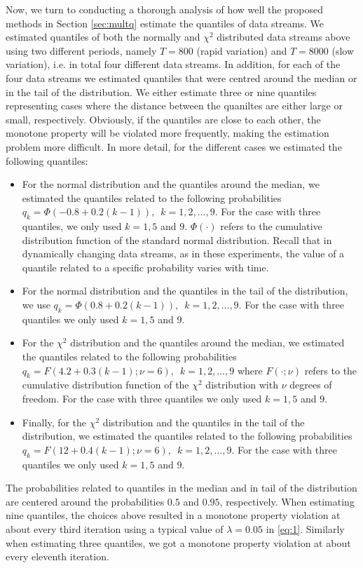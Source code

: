 \documentclass[10pt, a4paper]{article}
\newtheorem{rational for conjecture}{Rational for Conjecture}
\begin{document}
Now, we turn to conducting a thorough analysis of how well the proposed methods in Section \ref{sec:multq} estimate the quantiles of data streams. We estimated quantiles of both the normally and $\chi^2$ distributed data streams above using two different periods, namely $T=800$ (rapid variation) and $T=8000$ (slow variation), i.e. in total four different data streams. In addition, for each of the four data streams we estimated quantiles that were centred around the median or in the tail of the distribution. We either estimate three or nine quantiles representing cases where the distance between the quaniltes are either large or small, respectively. Obviously, if the quantiles are close to each other, the monotone property will be violated more frequently, making the estimation problem  more difficult. In more detail, for the different cases we estimated the following quantiles:
\begin{itemize}
\item For the normal distribution and the quantiles around the median, we estimated the quantiles related to the following probabilities $q_k = \Phi(-0.8 + 0.2(k-1)), \,\,\, k=1,2,\ldots,9$. For the case with three quantiles, we only used $k=1,5$ and $9$. $\Phi(\cdot)$ refers to the cumulative distribution function of the standard normal distribution. Recall that in dynamically changing data streams, as in these experiments, the value of a quantile related to a specific probability varies with time.
\item For the normal distribution and the quantiles in the tail of the distribution, we use $q_k = \Phi(0.8 + 0.2(k-1)), \,\,\, k=1,2,\ldots,9$. For the case with three quantiles we only used $k=1,5$ and $9$.
\item For the $\chi^2$ distribution and the quantiles around the median, we estimated the quantiles related to the following probabilities $q_k = F(4.2 + 0.3(k-1); \nu = 6), \,\,\, k=1,2,\ldots,9$ where $F(\cdot;\nu)$ refers to the cumulative distribution function of the $\chi^2$ distribution with $\nu$ degrees of freedom. For the case with three quantiles we only used $k=1,5$ and $9$.
\item Finally, for the $\chi^2$ distribution and the quantiles in the tail of the distribution, we estimated the quantiles related to the following probabilities $q_k = F(12 + 0.4(k-1); \nu = 6), \,\,\, k=1,2,\ldots,9$. For the case with three quantiles we only used $k=1,5$ and $9$.
\end{itemize}
The probabilities related to quantiles in the median and in tail of the distribution are  centered around the probabilities $0.5$ and $0.95$, respectively.
When estimating nine quantiles, the choices above resulted in a monotone property violation at about every third iteration using a typical value of $\lambda = 0.05$ in \eqref{eq:1}. Similarly when estimating three quantiles, we got a monotone property violation at about every eleventh iteration.
\end{document}

